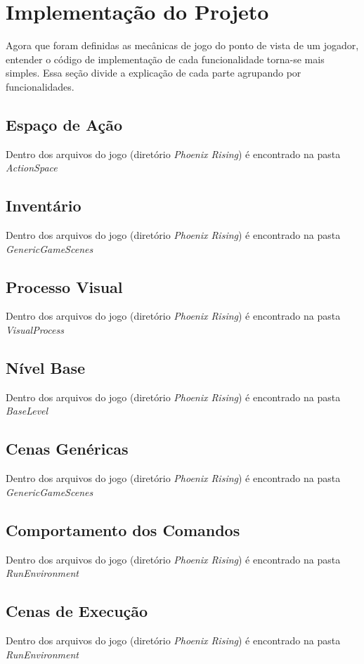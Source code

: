 
\chapter{Implementação do Projeto}
\label{cap:Implementação}

Agora que foram definidas as mecânicas de jogo do ponto de vista de um jogador,
entender o código de implementação de cada funcionalidade torna-se mais simples.
Essa seção divide a explicação de cada parte agrupando por funcionalidades.

\section{Espaço de Ação}

Dentro dos arquivos do jogo (diretório \textit{Phoenix Rising}) é encontrado na 
pasta \textit{ActionSpace}

\section{Inventário}

Dentro dos arquivos do jogo (diretório \textit{Phoenix Rising}) é encontrado na 
pasta \textit{GenericGameScenes}

\section{Processo Visual}

Dentro dos arquivos do jogo (diretório \textit{Phoenix Rising}) é encontrado na
pasta \textit{VisualProcess}

\section{Nível Base}

Dentro dos arquivos do jogo (diretório \textit{Phoenix Rising}) é encontrado na
pasta \textit{BaseLevel}

\section{Cenas Genéricas}

Dentro dos arquivos do jogo (diretório \textit{Phoenix Rising}) é encontrado na
pasta \textit{GenericGameScenes}

\section{Comportamento dos Comandos}

Dentro dos arquivos do jogo (diretório \textit{Phoenix Rising}) é encontrado na
pasta \textit{RunEnvironment}

\section{Cenas de Execução}

Dentro dos arquivos do jogo (diretório \textit{Phoenix Rising}) é encontrado na
pasta \textit{RunEnvironment}


